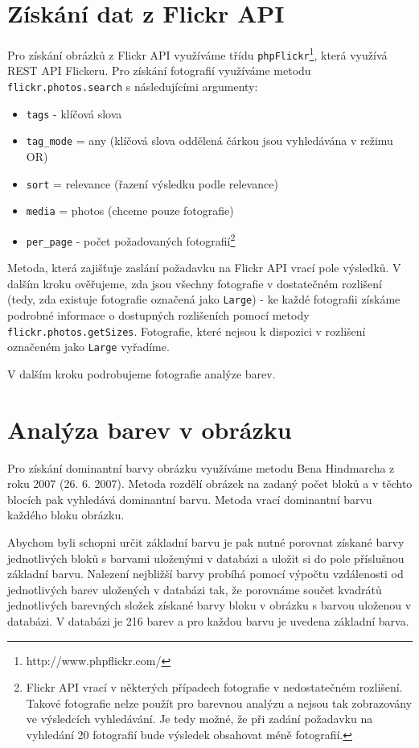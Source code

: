 \documentclass[12pt]{article}
\begin{document}
\section{Získání dat z Flickr API}
Pro získání obrázků z Flickr API využíváme třídu \texttt{phpFlickr}\footnote{http://www.phpflickr.com/}, která využívá REST API Flickeru. Pro získání fotografií využíváme metodu \texttt{flickr.photos.search} s následujícími argumenty:
\begin{itemize}
\item \texttt{tags} - klíčová slova
\item \texttt{tag\_mode} = any (klíčová slova oddělená čárkou jsou vyhledávána v režimu OR)
\item \texttt{sort} = relevance (řazení výsledku podle relevance)
\item \texttt{media} = photos (chceme pouze fotografie)
\item \texttt{per\_page} - počet požadovaných fotografií\footnote{Flickr API vrací v některých případech fotografie v nedostatečném rozlišení. Takové fotografie nelze použít pro barevnou analýzu a nejsou tak zobrazovány ve výsledcích vyhledávání. Je tedy možné, že při zadání požadavku na vyhledání 20 fotografií bude výsledek obsahovat méně fotografií.}
\end{itemize}

Metoda, která zajišťuje zaslání požadavku na Flickr API vrací pole výsledků. V dalším kroku ověřujeme, zda jsou všechny fotografie v dostatečném rozlišení (tedy, zda existuje fotografie označená jako \texttt{Large}) - ke každé fotografii získáme podrobné informace o dostupných rozlišeních pomocí metody \texttt{flickr.photos.getSizes}. Fotografie, které nejsou k dispozici v rozlišení označeném jako \texttt{Large} vyřadíme.

V dalším kroku podrobujeme fotografie analýze barev.

\section{Analýza barev v obrázku}
Pro získání dominantní barvy obrázku využíváme metodu Bena Hindmarcha z roku 2007 (26. 6. 2007). Metoda rozdělí obrázek na zadaný počet bloků a v těchto blocích pak vyhledává dominantní barvu. Metoda vrací dominantní barvu každého bloku obrázku.

Abychom byli schopni určit základní barvu je pak nutné porovnat získané barvy jednotlivých bloků s barvami uloženými v databázi a uložit si do pole příslušnou základní barvu. Nalezení nejbližší barvy probíhá pomocí výpočtu vzdálenosti od jednotlivých barev uložených v databázi tak, že porovnáme součet kvadrátů jednotlivých barevných složek získané barvy bloku v obrázku s barvou uloženou v databázi. V databázi je 216 barev a pro každou barvu je uvedena základní barva.
\end{document}
